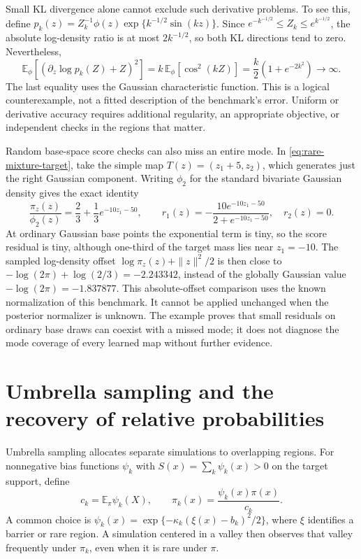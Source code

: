 Small KL divergence alone cannot exclude such derivative problems. To see
this, define $p_k(z)=Z_k^{-1}\phi(z)\exp\{k^{-1/2}\sin(kz)\}$. Since
$e^{-k^{-1/2}}\leq Z_k\leq e^{k^{-1/2}}$, the absolute log-density ratio
is at most $2k^{-1/2}$, so both KL directions tend to zero. Nevertheless,
\begin{equation}
 \mathbb E_\phi\left[(\partial_z\log p_k(Z)+Z)^2\right]
 =k\,\mathbb E_\phi[\cos^2(kZ)]
 =\frac{k}{2}(1+e^{-2k^2})\longrightarrow\infty.
 \label{eq:rare-kl-score-counterexample}
\end{equation}
The last equality uses the Gaussian characteristic function. This is a logical
counterexample, not a fitted description of the benchmark's error. Uniform or
derivative accuracy requires additional regularity, an appropriate objective,
or independent checks in the regions that matter.

Random base-space score checks can also miss an entire mode. In
\eqref{eq:rare-mixture-target}, take the simple map
$T(z)=(z_1+5,z_2)$, which generates just the right Gaussian component.
Writing $\phi_2$ for the standard bivariate Gaussian density gives the exact
identity
\begin{equation}
 \frac{\pi_z(z)}{\phi_2(z)}
 =\frac23+\frac13 e^{-10z_1-50},\qquad
 r_1(z)=-\frac{10e^{-10z_1-50}}{2+e^{-10z_1-50}},\quad r_2(z)=0.
 \label{eq:rare-missing-mode-score}
\end{equation}
At ordinary Gaussian base points the exponential term is tiny, so the score
residual is tiny, although one-third of the target mass lies near $z_1=-10$.
The sampled log-density offset
$\log\pi_z(z)+\|z\|^2/2$ is then close to
$-\log(2\pi)+\log(2/3)=-2.243342$, instead of the globally Gaussian value
$-\log(2\pi)=-1.837877$. This absolute-offset comparison uses the known
normalization of this benchmark. It cannot be applied unchanged when the
posterior normalizer is unknown. The example proves that small residuals on
ordinary base draws can coexist with a missed mode; it does not diagnose the
mode coverage of every learned map without further evidence.

\section[Umbrella sampling and relative probabilities]{Umbrella sampling and the recovery of relative probabilities}

Umbrella sampling allocates separate simulations to overlapping regions. For
nonnegative bias functions $\psi_k$ with $S(x)=\sum_k\psi_k(x)>0$ on the
target support, define
\begin{equation}
 c_k=\mathbb E_\pi\psi_k(X),\qquad
 \pi_k(x)=\frac{\psi_k(x)\pi(x)}{c_k}.
 \label{eq:rare-umbrella-density}
\end{equation}
A common choice is
$\psi_k(x)=\exp\{-\kappa_k(\xi(x)-b_k)^2/2\}$, where $\xi$ identifies a
barrier or rare region. A simulation centered in a valley then observes that
valley frequently under $\pi_k$, even when it is rare under $\pi$.

